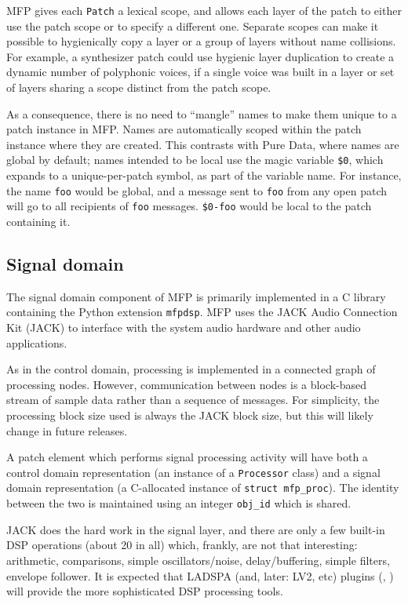 \documentclass[11pt,a4paper]{article}
\begin{document}
MFP gives each \texttt{Patch} a lexical scope, and allows each layer of the
patch to either use the patch scope or to specify a different one.
Separate scopes can make it possible to hygienically copy a layer or a
group of layers without name collisions.  For example, a synthesizer patch
could use hygienic layer duplication to create a dynamic number of
polyphonic voices, if a single voice was built in a layer or set of layers
sharing a scope distinct from the patch scope. 

As a consequence, there is no need to ``mangle'' names to make them unique
to a patch instance in MFP.  Names are automatically scoped within the
patch instance where they are created.  This contrasts with Pure Data,
where names are global by default; names intended to be local use the magic
variable \texttt{\$0}, which expands to a unique-per-patch symbol, as part
of the variable name.  For instance, the name \texttt{foo} would be global,
and a message sent to \texttt{foo} from any open patch will go to all
recipients of \texttt{foo} messages.  \texttt{\$0-foo} would be local to
the patch containing it. 

\subsection{Signal domain}

The signal domain component of MFP is primarily implemented in a C library
containing the Python extension \texttt{mfpdsp}.  MFP uses the JACK Audio
Connection Kit (JACK) \cite{JACK} to interface with the system audio
hardware and other audio applications. 

As in the control domain, processing is implemented in a connected graph of
processing nodes.  However, communication between nodes is a block-based
stream of sample data rather than a sequence of messages. For simplicity,
the processing block size used is always the JACK block size, but this will
likely change in future releases.  

A patch element which performs signal processing activity will have both a
control domain representation (an instance of a \texttt{Processor} class)
and a signal domain representation (a C-allocated instance of
\texttt{struct mfp\_proc}).  The identity between the two is maintained
using an integer \texttt{obj\_id} which is shared. 

JACK does the hard work in the signal layer, and there are only a few
built-in DSP operations (about 20 in all) which, frankly, are not that
interesting: arithmetic, comparisons, simple oscillators/noise,
delay/buffering, simple filters, envelope follower.  It is expected that
LADSPA (and, later: LV2, etc) plugins (\cite{LADSPA}, \cite{LV2}) will
provide the more sophisticated DSP processing tools. 
\end{document}
